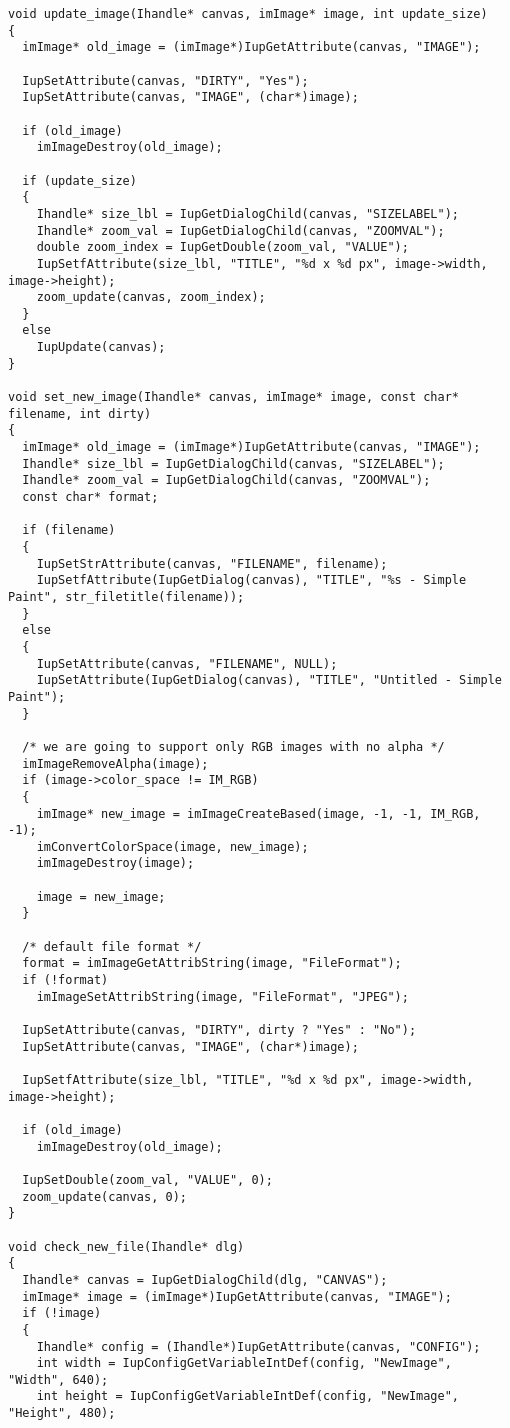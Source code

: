 \documentclass{ctexart}
\begin{document}
\begin{lstlisting}
void update_image(Ihandle* canvas, imImage* image, int update_size)
{
  imImage* old_image = (imImage*)IupGetAttribute(canvas, "IMAGE");

  IupSetAttribute(canvas, "DIRTY", "Yes");
  IupSetAttribute(canvas, "IMAGE", (char*)image);

  if (old_image)
    imImageDestroy(old_image);

  if (update_size)
  {
    Ihandle* size_lbl = IupGetDialogChild(canvas, "SIZELABEL");
    Ihandle* zoom_val = IupGetDialogChild(canvas, "ZOOMVAL");
    double zoom_index = IupGetDouble(zoom_val, "VALUE");
    IupSetfAttribute(size_lbl, "TITLE", "%d x %d px", image->width, image->height);
    zoom_update(canvas, zoom_index);
  }
  else
    IupUpdate(canvas);
}

void set_new_image(Ihandle* canvas, imImage* image, const char* filename, int dirty)
{
  imImage* old_image = (imImage*)IupGetAttribute(canvas, "IMAGE");
  Ihandle* size_lbl = IupGetDialogChild(canvas, "SIZELABEL");
  Ihandle* zoom_val = IupGetDialogChild(canvas, "ZOOMVAL");
  const char* format;

  if (filename)
  {
    IupSetStrAttribute(canvas, "FILENAME", filename);
    IupSetfAttribute(IupGetDialog(canvas), "TITLE", "%s - Simple Paint", str_filetitle(filename));
  }
  else
  {
    IupSetAttribute(canvas, "FILENAME", NULL);
    IupSetAttribute(IupGetDialog(canvas), "TITLE", "Untitled - Simple Paint");
  }

  /* we are going to support only RGB images with no alpha */
  imImageRemoveAlpha(image);
  if (image->color_space != IM_RGB)
  {
    imImage* new_image = imImageCreateBased(image, -1, -1, IM_RGB, -1);
    imConvertColorSpace(image, new_image);
    imImageDestroy(image);

    image = new_image;
  }

  /* default file format */
  format = imImageGetAttribString(image, "FileFormat");
  if (!format)
    imImageSetAttribString(image, "FileFormat", "JPEG");

  IupSetAttribute(canvas, "DIRTY", dirty ? "Yes" : "No");
  IupSetAttribute(canvas, "IMAGE", (char*)image);

  IupSetfAttribute(size_lbl, "TITLE", "%d x %d px", image->width, image->height);

  if (old_image)
    imImageDestroy(old_image);

  IupSetDouble(zoom_val, "VALUE", 0);
  zoom_update(canvas, 0);
}

void check_new_file(Ihandle* dlg)
{
  Ihandle* canvas = IupGetDialogChild(dlg, "CANVAS");
  imImage* image = (imImage*)IupGetAttribute(canvas, "IMAGE");
  if (!image)
  {
    Ihandle* config = (Ihandle*)IupGetAttribute(canvas, "CONFIG");
    int width = IupConfigGetVariableIntDef(config, "NewImage", "Width", 640);
    int height = IupConfigGetVariableIntDef(config, "NewImage", "Height", 480);


\end{lstlisting}
\end{document}

